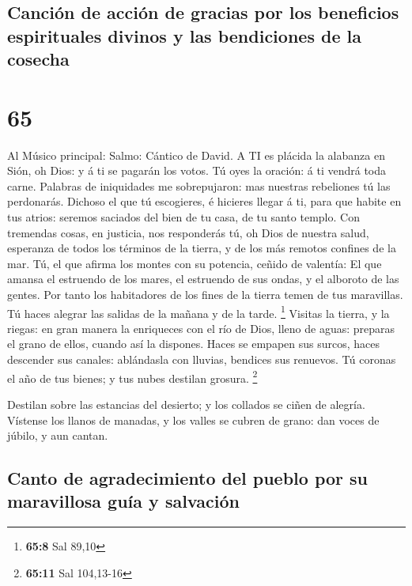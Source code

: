 \hypertarget{canciuxf3n-de-acciuxf3n-de-gracias-por-los-beneficios-espirituales-divinos-y-las-bendiciones-de-la-cosecha}{%
\subsection{Canción de acción de gracias por los beneficios espirituales
divinos y las bendiciones de la
cosecha}\label{canciuxf3n-de-acciuxf3n-de-gracias-por-los-beneficios-espirituales-divinos-y-las-bendiciones-de-la-cosecha}}

\hypertarget{section-64}{%
\section{65}\label{section-64}}

 Al Músico principal: Salmo: Cántico de David. A TI es
plácida la alabanza en Sión, oh Dios: y á ti se pagarán los votos.
 Tú oyes la oración: á ti vendrá toda carne. 
Palabras de iniquidades me sobrepujaron: mas nuestras rebeliones tú las
perdonarás.  Dichoso el que tú escogieres, é hicieres llegar
á ti, para que habite en tus atrios: seremos saciados del bien de tu
casa, de tu santo templo.  Con tremendas cosas, en justicia,
nos responderás tú, oh Dios de nuestra salud, esperanza de todos los
términos de la tierra, y de los más remotos confines de la mar.
 Tú, el que afirma los montes con su potencia, ceñido de
valentía:  El que amansa el estruendo de los mares, el
estruendo de sus ondas, y el alboroto de las gentes.  Por
tanto los habitadores de los fines de la tierra temen de tus maravillas.
Tú haces alegrar las salidas de la mañana y de la tarde. \footnote{\textbf{65:8}
  Sal 89,10}  Visitas la tierra, y la riegas: en gran manera
la enriqueces con el río de Dios, lleno de aguas: preparas el grano de
ellos, cuando así la dispones.  Haces se empapen sus
surcos, haces descender sus canales: ablándasla con lluvias, bendices
sus renuevos.  Tú coronas el año de tus bienes; y tus nubes
destilan grosura. \footnote{\textbf{65:11} Sal 104,13-16}

 Destilan sobre las estancias del desierto; y los collados
se ciñen de alegría.  Vístense los llanos de manadas, y los
valles se cubren de grano: dan voces de júbilo, y aun cantan.

\hypertarget{canto-de-agradecimiento-del-pueblo-por-su-maravillosa-guuxeda-y-salvaciuxf3n}{%
\subsection{Canto de agradecimiento del pueblo por su maravillosa guía y
salvación}\label{canto-de-agradecimiento-del-pueblo-por-su-maravillosa-guuxeda-y-salvaciuxf3n}}

